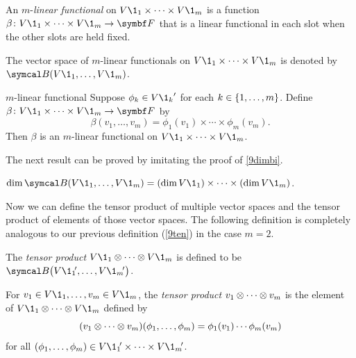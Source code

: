 {\begin{Itemize}
\item
An $m$-\emph{linear functional} on $V\1_1 \times \cdots \times V\1_m$ is a function
$\fun \beta {V\1_1 \times \cdots \times V\1_m} {\F{}}$ that is a linear functional in each slot when the other slots are held fixed.
\item
The vector space of $m$-linear functionals on $V\1_1 \times \cdots \times V\1_m$ is denoted by
$\B(V\1_1, \ldots, V\1_m)$.
\end{Itemize}}

\begin{example}{$m$-linear functional}
Suppose $\phi_k \in {V\1_k}'$ for each $k \in \{1, \ldots, m\}$. Define $\fun \beta {V\1_1 \times \cdots \times V\1_m} {\F{}}$ by
\[
\beta(v_1, \ldots, v_m) = \phi_1(v_1) \times \cdots \times \phi_m(v_m).
\]
Then $\beta$ is an $m$-linear functional on $V\1_1 \times \cdots \times V\1_m$.
\end{example}

The next result can be proved by imitating the proof of \ref{9dimbi}.

{$\dim \B(V\1_1, \ldots, V\1_m) = (\dim V\1_1) \times \cdots \times (\dim V\1_m)$.}

Now we can define the tensor product of multiple vector spaces and the tensor product of elements of those vector spaces. The following definition is completely analogous to our previous definition (\ref{9ten}) in the case $m = 2$.

{\begin{Itemize}
\item
The \emph{tensor product} $V\1_1 \tensor \cdots \tensor V\1_m$ is defined to be $\B\paren[\big]{V\1_1\!', \ldots, V\1_m\!'}$.
\item
For $v_1 \in V\1_1, \ldots, v_m \in V\1_m$, the \emph{tensor product} $v_1 \otimes \cdots \otimes v_m$ is the element of $V\1_1 \tensor \cdots \tensor V\1_m$ defined by
\vspace{-5bp}
\[
(v_1 \tensor \cdots \tensor v_m)(\phi_1, \ldots, \phi_m) = \phi_1(v_1) \cdots \phi_m(v_m)
\vspace{-5bp}
\]
for all $(\phi_1, \ldots, \phi_m) \in V\1_1\!' \times \cdots \times V\1_m\!'$.
\end{Itemize}}

